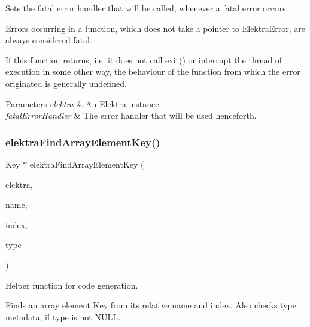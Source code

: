 Sets the fatal error handler that will be called, whenever a fatal error occurs. 

Errors occurring in a function, which does not take a pointer to Elektra\+Error, are always considered fatal.

If this function returns, i.\+e. it does not call exit() or interrupt the thread of execution in some other way, the behaviour of the function from which the error originated is generally undefined.


\begin{DoxyParams}{Parameters}
{\em elektra} & An Elektra instance. \\
\hline
{\em fatal\+Error\+Handler} & The error handler that will be used henceforth. \\
\hline
\end{DoxyParams}
\mbox{\label{group__highlevel_gac822ee43ab690e671ed47129a8b47cdc}} 
\subsubsection{\texorpdfstring{elektra\+Find\+Array\+Element\+Key()}{elektraFindArrayElementKey()}}
{\footnotesize\ttfamily Key $\ast$ elektra\+Find\+Array\+Element\+Key (\begin{DoxyParamCaption}\item[{Elektra $\ast$}]{elektra,  }\item[{const char $\ast$}]{name,  }\item[{kdb\+\_\+long\+\_\+long\+\_\+t}]{index,  }\item[{K\+D\+B\+Type}]{type }\end{DoxyParamCaption})}



Helper function for code generation. 

Finds an array element Key from its relative name and index. Also checks type metadata, if {\ttfamily type} is not N\+U\+LL.



